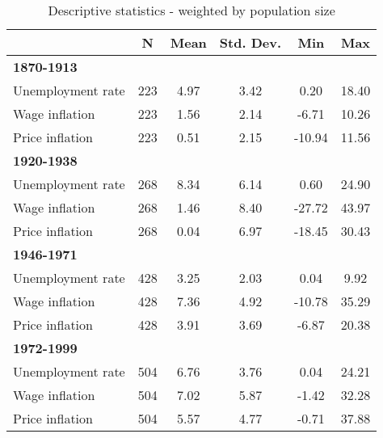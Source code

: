 \begin{table}[htbp]\centering
\def\sym#1{\ifmmode^{#1}\else\(^{#1}\)\fi}
\caption{Descriptive statistics - weighted by population size \label{T:DescriptivesW}}
\begin{tabular}{l*{1}{ccccc}}
\hline\hline
                                         
                    &       \textbf{N}    &        \textbf{Mean}&   \textbf{Std. Dev.}&         \textbf{Min}&         \textbf{Max}\\
\hline
\textbf{1870-1913}           &            &            &            &            &            \\
Unemployment rate   &         223&        4.97&        3.42&        0.20&       18.40\\
Wage inflation      &         223&        1.56&        2.14&       -6.71&       10.26\\
Price inflation     &         223&        0.51&        2.15&      -10.94&       11.56\\
\hline
\textbf{1920-1938}           &            &            &            &            &            \\
Unemployment rate   &         268&        8.34&        6.14&        0.60&       24.90\\
Wage inflation      &         268&        1.46&        8.40&      -27.72&       43.97\\
Price inflation     &         268&        0.04&        6.97&      -18.45&       30.43\\
\hline
\textbf{1946-1971}           &            &            &            &            &            \\
Unemployment rate   &         428&        3.25&        2.03&        0.04&        9.92\\
Wage inflation      &         428&        7.36&        4.92&      -10.78&       35.29\\
Price inflation     &         428&        3.91&        3.69&       -6.87&       20.38\\
\hline
\textbf{1972-1999}           &            &            &            &            &            \\
Unemployment rate   &         504&        6.76&        3.76&        0.04&       24.21\\
Wage inflation      &         504&        7.02&        5.87&       -1.42&       32.28\\
Price inflation     &         504&        5.57&        4.77&       -0.71&       37.88\\

\end{tabular}
\end{table}
